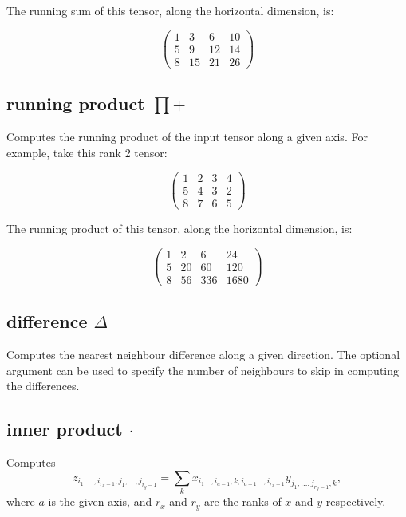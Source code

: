 The running sum of this tensor, along the horizontal dimension, is: 

\begin{displaymath}
  \left(
  \begin{array}{cccc}
    1& 3& 6& 10 \\
    5& 9& 12& 14 \\
    8& 15& 21& 26
  \end{array}
  \right)
\end{displaymath}

\subsection{running product $\prod+$}
\label{Operation:runningProduct} Computes the running
product of the input tensor along a given axis. For example, take
this rank 2 tensor:

\begin{displaymath}
  \left(
  \begin{array}{cccc}
    1& 2& 3& 4\\ 
    5& 4& 3& 2\\ 
    8& 7& 6& 5 
  \end{array}
  \right)
\end{displaymath}

The running product of this tensor, along the horizontal dimension, is: 

\begin{displaymath}
  \left(
  \begin{array}{cccc}
    1& 2& 6& 24\\ 
    5& 20& 60& 120\\ 
    8& 56& 336& 1680 
  \end{array}
  \right)
\end{displaymath}

\subsection{difference $\Delta$}\label{Operation:difference}
Computes the nearest neighbour difference along a given direction. The
optional argument can be used to specify the number of neighbours to
skip in computing the differences.

\subsection{inner product $\cdot$}\label{Operation:innerProduct}
Computes
\begin{displaymath}
z_{i_1,\ldots,i_{r_x-1},j_1,\ldots,j_{r_y-1}} =
\sum_k x_{i_1\ldots,i_{a-1},k,i_{a+1}\ldots,i_{r_x-1}}
y_{j_1,\ldots,j_{r_y-1},k},
\end{displaymath}
where $a$ is the given axis, and $r_x$ and $r_y$ are the ranks of $x$ and $y$ respectively.


